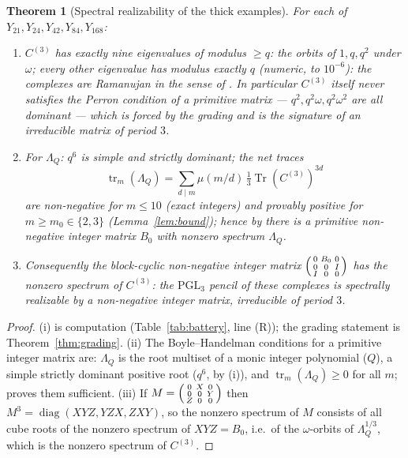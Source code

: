 \documentclass[11pt]{amsart}
\numberwithin{equation}{section}
\newtheorem{theorem}{Theorem}[section]
\theoremstyle{definition}
\theoremstyle{remark}
\newcommand{\Z}{\mathbb{Z}}
\newcommand{\Tr}{\operatorname{Tr}}
\newcommand{\tr}{\operatorname{tr}}
\newcommand{\PGL}{\mathrm{PGL}}
\newcommand{\Cthree}{C^{(3)}}
\begin{document}
\begin{theorem}[Spectral realizability of the thick examples]\label{thm:realizable}
For each of $Y_{21},Y_{24},Y_{42},Y_{84},Y_{168}$:
\begin{enumerate}
\item[(i)] $\Cthree$ has exactly nine eigenvalues of modulus $\ge q$: the orbits of $1,q,q^{2}$
under $\omega$; every other eigenvalue has modulus exactly $q$ (numeric, to $10^{-6}$): the
complexes are Ramanujan in the sense of \cite{KL}. In particular $\Cthree$ itself never
satisfies the Perron condition of a primitive matrix --- $q^{2},q^{2}\omega,q^{2}\omega^{2}$
are all dominant --- which is forced by the grading and is the signature of an irreducible
matrix of period $3$.
\item[(ii)] For $\Lambda_Q$: $q^{6}$ is simple and strictly dominant; the net traces
\[
\tr_m(\Lambda_Q)=\sum_{d\mid m}\mu(m/d)\,\tfrac13\Tr(\Cthree)^{3d}
\]
are non-negative for $m\le10$ (exact integers) and provably positive for
$m\ge m_0\in\{2,3\}$ (Lemma~\ref{lem:bound}); hence by \cite{KOR} there is a primitive
non-negative integer matrix $B_0$ with nonzero spectrum $\Lambda_Q$.
\item[(iii)] Consequently the block-cyclic non-negative integer matrix
$\begin{psmallmatrix}0&B_0&0\\0&0&I\\I&0&0\end{psmallmatrix}$ has the nonzero spectrum of
$\Cthree$: the $\PGL_3$ pencil of these complexes is spectrally realizable by a non-negative
integer matrix, irreducible of period $3$.
\end{enumerate}
\end{theorem}

\begin{proof}
(i) is computation (Table~\ref{tab:battery}, line (R)); the grading statement is
Theorem~\ref{thm:grading}. (ii) The Boyle--Handelman conditions for a primitive integer
matrix are: $\Lambda_Q$ is the root multiset of a monic integer polynomial ($Q$), a simple
strictly dominant positive root ($q^{6}$, by (i)), and $\tr_m(\Lambda_Q)\ge0$ for all $m$;
\cite{KOR} proves them sufficient. (iii) If $M=\begin{psmallmatrix}0&X&0\\0&0&Y\\Z&0&0
\end{psmallmatrix}$ then $M^{3}=\operatorname{diag}(XYZ,YZX,ZXY)$, so the nonzero spectrum
of $M$ consists of all cube roots of the nonzero spectrum of $XYZ=B_0$, i.e.\ of the
$\omega$-orbits of $\Lambda_Q^{1/3}$, which is the nonzero spectrum of $\Cthree$.
\end{proof}
\end{document}
